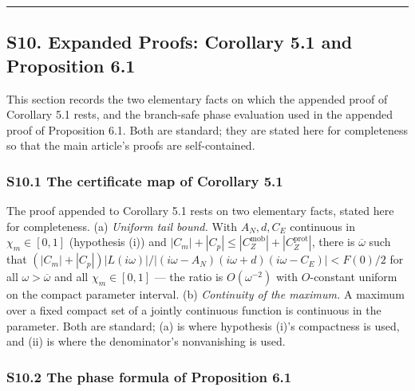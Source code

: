 \documentclass[
  10pt,
  a4paper,
]{article}
\begin{document}
\begin{center}\rule{0.5\linewidth}{0.5pt}\end{center}

\subsection{S10. Expanded Proofs: Corollary 5.1 and Proposition
6.1}\label{s10.-expanded-proofs-corollary-5.1-and-proposition-6.1}

This section records the two elementary facts on which the appended
proof of Corollary 5.1 rests, and the branch-safe phase evaluation used
in the appended proof of Proposition 6.1. Both are standard; they are
stated here for completeness so that the main article's proofs are
self-contained.

\subsubsection{S10.1 The certificate map of Corollary
5.1}\label{s10.1-the-certificate-map-of-corollary-5.1}

The proof appended to Corollary 5.1 rests on two elementary facts,
stated here for completeness. (a) \emph{Uniform tail bound.} With
\(A_N, d, C_E\) continuous in \(\chi_m \in [0,1]\) (hypothesis (i)) and
\(|C_m| + |C_p| \le |C_Z^{\mathrm{mob}}| + |C_Z^{\mathrm{prot}}|\),
there is \(\overline\omega\) such that
\((|C_m|+|C_p|)|L(i\omega)|/|(i\omega-A_N)(i\omega+d)(i\omega-C_E)| < F(0)/2\)
for all \(\omega > \overline\omega\) and all \(\chi_m \in [0,1]\) ---
the ratio is \(O(\omega^{-2})\) with \(O\)-constant uniform on the
compact parameter interval. (b) \emph{Continuity of the maximum.} A
maximum over a fixed compact set of a jointly continuous function is
continuous in the parameter. Both are standard; (a) is where hypothesis
(i)'s compactness is used, and (ii) is where the denominator's
nonvanishing is used.

\subsubsection{S10.2 The phase formula of Proposition
6.1}\label{s10.2-the-phase-formula-of-proposition-6.1}
\end{document}
